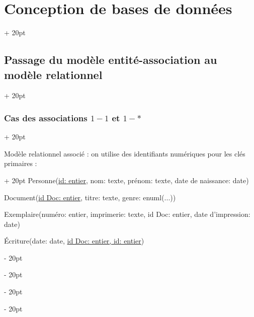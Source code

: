 \documentclass[a4paper, 12pt, twoside]{article}
\newcommand{\ind}[1][20pt]{\advance\leftskip + #1}
\newcommand{\deind}[1][20pt]{\advance\leftskip - #1}
\newenvironment{indt}[2][20pt]{#2 \par \ind[#1]}{\par \deind} %
\begin{document}
\begin{indt}{\section{Conception de bases de données}}
\begin{indt}{\subsection{Passage du modèle entité-association au modèle relationnel}}
\begin{indt}{\subsubsection{Cas des associations $1-1$ et $1-*$}}
\begin{center}
                \end{center}

                \begin{indt}{Modèle relationnel associé : on utilise des identifiants numériques pour les clés primaires :}
                    Personne(\underline{id: entier}, nom: texte, prénom: texte, date de naissance: date)
                    
                    Document(\underline{id Doc: entier}, titre: texte, genre: enuml(...))
                    
                    Exemplaire(numéro: entier, imprimerie: texte, id Doc: entier, date d'impression: date)
                    
                    \'Ecriture(date: date, \underline{id Doc: entier, id: entier})
                \end{indt}
            \end{indt}
        \end{indt}
    \end{indt}

    \vspace{12pt}
    
\end{document}
